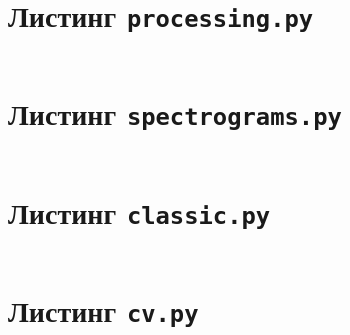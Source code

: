 \documentclass[spec, och, diploma]{SCWorks}
\begin{document}
    \section{Листинг \texttt{processing.py}}
    \inputminted{py}{code/processing.py}

    \section{Листинг \texttt{spectrograms.py}}
    \inputminted{py}{code/spectrograms.py}

    \section{Листинг \texttt{classic.py}}
    \inputminted{py}{code/classic.py}

    \section{Листинг \texttt{cv.py}}
    \inputminted{py}{code/cv.py}
\end{document}
